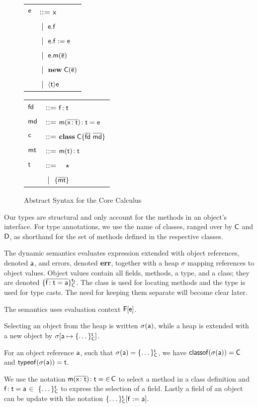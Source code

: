 \documentclass[preprint]{sigplanconf}
\newcommand{\fd}{\M{\xt{fd}}}
\newcommand{\md}{\M{\xt{md}}}
\newcommand{\mt}{\M{\xt{mt}}}
\newcommand{\m}{\M{\xt{m}}}
\newcommand{\e}{\M{\xt{e}}}
\newcommand{\f}{\M{\xt{f}}}
\newcommand{\x}{\M{\xt{x}}}
\renewcommand{\t}{\M{\xt{t}}}
\renewcommand{\c}{\M{\xt{c}}}
\newcommand{\C}{\M{\xt{C}}}
\newcommand{\D}{\M{\xt{D}}}
\newcommand{\err}{\M{\bt{err}}}
\newcommand{\s}{\M{\sigma}}
\renewcommand{\a}{\M{\xt a}}
\newcommand{\F}{\M{\xt F}}
\newcommand{\tp}[1]{\M{ \t_{#1} }}
\newcommand{\new}{\M{\bt{new}}}
\newcommand{\Get}[2]{\M{#1.#2}}
\newcommand{\Set}[3]{\M{#1.#2:=#3}}
\newcommand{\Call}[3]{\M{#1.#2(#3)}}
\newcommand{\New}[2]{\M{\new\;#1({#2})}}
\newcommand{\Cast}[2]{\M{\langle{#1}\rangle{#2}}}
\newcommand{\any}{\M{\star}}
\newcommand{\Type}[1]{\M{\{ #1 \}}}
\newcommand{\HT}[2]{\M{{#1}\!:{#2}}}
\newcommand{\Mdef}[5]{\M{ \HT { #1( \b{\HT{#2}{#3}})}{#4}={#5}}}
\newcommand{\Ftype}[2]{\M{ \HT{#1}{#2} }}
\newcommand{\Fdef}[3]{\M{ \HT{#1}{#2}={#3} }}
\newcommand{\Mtype}[3]{\M{ \HT { #1( #2 )}{#3}}}
\newcommand{\Class}[3]{\M{\bt{class}\;#1\{ #2 ~ #3 \}}}
\newcommand{\is}{\M{\mapsto}}
\newcommand{\Obj}[3]{ \M{\{ #1 \}^{#2}_{#3}}}
\newcommand{\Heap}[2]{\M{ #1[ #2 ] }}
\newcommand{\Alt}[1]{ &\B #1 \\}
\newcommand{\B}{\M{~|~}}
\newcommand{\M}[1]{\ensuremath{#1}\xspace}
\newcommand{\xt}[1]{\sf{#1}}
\newcommand{\bt}[1]{\xt{\bf #1}}
\renewcommand{\b}[1]{\M{\overline{#1}}}
\newcommand{\inc}{\M{\in}}
\newcommand{\Update}[3]{\M{#1[ #2 := #3]}}
\newcommand{\Bind}[2]{\M{#1 \is #2}}
\newcommand{\classofis}[2]{\M{\xt{classof}(#1)=#2}}
\newcommand{\typeofis}[2]{\M{\xt{typeof}(#1)=#2}}
\newcommand{\Sel}[2]{\M{#1(#2)}}
\begin{document}
\begin{figure}[!h]\begin{minipage}{3cm}\begin{tabular}{l@{~~~}l}
\e &::=  \x \\
   \Alt{ \Get\e\f }
   \Alt{ \Set\e\f\e }
   \Alt{ \Call\e\m{\b\e} }
   \Alt{ \New\C{\b\e} }
   \Alt{ \Cast\t\e }
\end{tabular}\end{minipage}\begin{minipage}{3cm}\begin{tabular}{l@{~~~}l}
\fd &::= 
    \Ftype\f\t   \\
\md &::=
    \Mdef\m\x\t\t\e \\
\c &::= \Class \C {\b{\fd}}{\b{\md} } \\
\mt &::= \Mtype\m\t\t\\
\t &::= ~ \any \\
   \Alt{ \Type{  \b{ \mt } } }
\end{tabular}\end{minipage}
\caption{Abstract Syntax for the Core Calculus}\label{syn}
\end{figure}

Our types are structural and only account for the methods in an object's
interface. For type annotations, we use the name of classes, ranged over by
\C and \D, as shorthand for the set of methods defined in the respective
classes.


The dynamic semantics evaluates expression extended with object references,
denoted \a, and errors, denoted \err, together with a heap \s mapping
references to object values. Object values contain all fields, methods, a
type, and a class; they are denoted \Obj{\b{\Fdef\f\t\a}}{\tp 1}{\C}. The
class is used for locating methods and the type is used for type casts. The
need for keeping them separate will become clear later.

The semantics uses evaluation context \M{\F[\e]}.

Selecting an object from the heap is written \Sel\s\a, while a heap is
extended with a new object by \Heap{\s}{\Bind{\a}{\Obj{\dots}\t\C}}.


For an object reference \a, such that \M{\Sel\s\a=\Obj{\dots}\t\C}, we have 
\classofis{\Sel\s\a}\C and \typeofis{\Sel\s\a}\t.

We use the notation \Mdef\m\x\t\t \inc\C to select a method in a class
definition and \Fdef\f\t\a\inc\Obj{\dots}\t\C to express the selection of a
field. Lastly a field of an object can be update with the notation
\Update{\Obj{\dots}\t\C}\f\a.
\end{document}
